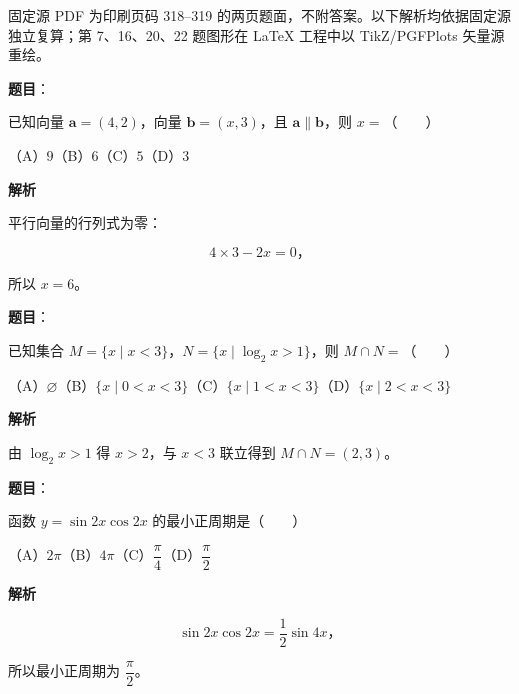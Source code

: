

\begin{gktip}
固定源 PDF 为印刷页码 318–319 的两页题面，不附答案。以下解析均依据固定源独立复算；第 7、16、20、22 题图形在 LaTeX 工程中以 TikZ/PGFPlots 矢量源重绘。
\end{gktip}

\begin{answer}

\textbf{题目}：

已知向量 $\boldsymbol a=(4,2)$，向量 $\boldsymbol b=(x,3)$，且 $\boldsymbol a\parallel\boldsymbol b$，则 $x=$\mbox{（　　）}

（A）$9$\quad（B）$6$\quad（C）$5$\quad（D）$3$

\textbf{解析}

平行向量的行列式为零：

\nopagebreak[4]
\[
4\times3-2x=0\text{，}
\]

所以 $x=6$。


\end{answer}
\begin{answer}

\textbf{题目}：

已知集合 $M=\{x\mid x<3\}$，$N=\{x\mid\log_2x>1\}$，则 $M\cap N=$\mbox{（　　）}

（A）$\varnothing$\quad（B）$\{x\mid0<x<3\}$\quad（C）$\{x\mid1<x<3\}$\quad（D）$\{x\mid2<x<3\}$

\textbf{解析}

由 $\log_2x>1$ 得 $x>2$，与 $x<3$ 联立得到 $M\cap N=(2,3)$。


\end{answer}
\begin{answer}

\textbf{题目}：

函数 $y=\sin2x\cos2x$ 的最小正周期是\mbox{（　　）}

（A）$2\pi$\quad（B）$4\pi$\quad（C）$\dfrac\pi4$\quad（D）$\dfrac\pi2$

\textbf{解析}

\nopagebreak[4]
\[
\sin2x\cos2x=\frac12\sin4x\text{，}
\]

所以最小正周期为 $\dfrac\pi2$。


\end{answer}
